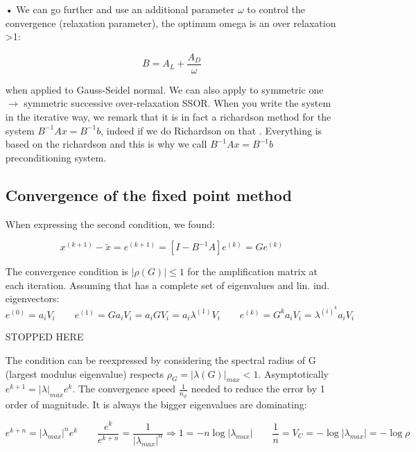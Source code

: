 \begin{itemize}

\item[•] We can go further and use an additional parameter $\omega$ to control the convergence (relaxation parameter), the optimum omega is an over relaxation >1: 

\begin{equation}
B = A_L + \frac{A _D}{\omega}
\end{equation}

when applied to Gauss-Seidel normal. We can also apply to symmetric one $\rightarrow$ symmetric successive over-relaxation SSOR. When you write the system in the iterative way, we remark that it is in fact a richardson method for the system $B^{-1}Ax= B^{-1}b$, indeed if we do Richardson on that . Everything is based on the richardson and this is why we call $B^{-1}Ax = B^{-1}b$ preconditioning system. 

\subsection{Convergence of the fixed point method}

When expressing the second condition, we found: 

\begin{equation}
x^{(k+1)}-\tilde{x} = e^{(k+1)} = [I-B^{-1}A]e^{(k)} = Ge^{(k)}
\end{equation}

The convergence condition is $|\rho (G)|\leq 1$ for the amplification matrix at each iteration. Assuming that has a complete set of eigenvalues and lin. ind. eigenvectors: 
\begin{equation}
e^{(0)} = a_i V_i \qquad e^{(1)} = Ga_i V_i  = a_i GV_i = a_i \lambda ^{(1)}V_i \qquad e^{(k)}=G^k a_iV_i = \lambda ^{(i)^k}a_iV_i
\end{equation}

STOPPED HERE

The condition can be reexpressed by considering the spectral radius of G (largest modulus eigenvalue) respects $\rho _G = |\lambda (G)|_{max}<1$. Asymptotically $e^{k+1} = |\lambda|_{max}e^k$. The convergence speed $\frac{1}{n_{it}}$ needed to reduce the error by 1 order of magnitude. It is always the bigger eigenvalues are dominating: 

\begin{equation}
e^{k+n} = |\lambda _{max}|^n e^k \qquad \frac{e^k}{e^{k+n}} = \frac{1}{|\lambda _{max}|^n} \Rightarrow 1 = -n\log |\lambda _{max}| \qquad \frac{1}{n} = V_C = -\log |\lambda _{max}| = - \log \rho
\end{equation}


\end{itemize}
